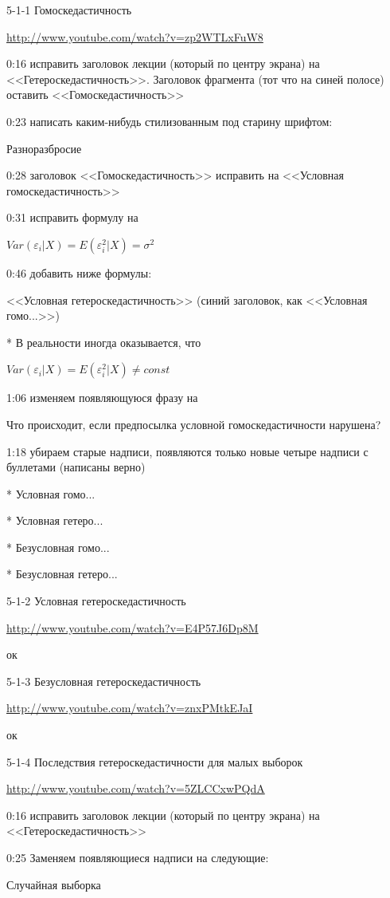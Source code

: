 \documentclass[12pt,a4paper]{article}
\newcommand{\e}{\varepsilon}
\begin{document}
5-1-1 Гомоскедастичность

\url{http://www.youtube.com/watch?v=zp2WTLxFuW8}

0:16 исправить заголовок лекции (который по центру экрана) на <<Гетероскедастичность>>. Заголовок фрагмента (тот что на синей полосе) оставить <<Гомоскедастичность>>


0:23 написать каким-нибудь стилизованным под старину шрифтом:

Разноразбросие

0:28 заголовок <<Гомоскедастичность>> исправить на <<Условная гомоскедастичность>>

0:31 исправить формулу на

$Var(\e_i|X)=E(\e_i^2|X)=\sigma^2$

0:46 добавить ниже формулы: 

<<Условная гетероскедастичность>>   (синий заголовок, как <<Условная гомо...>>)

* В реальности иногда оказывается, что

$Var(\e_i|X)=E(\e_i^2|X) \neq const$

1:06 изменяем появляющуюся фразу на 

Что происходит, если предпосылка условной гомоскедастичности нарушена?

1:18 убираем старые надписи, появляются только новые четыре надписи с буллетами (написаны верно)

* Условная гомо...

* Условная гетеро...

* Безусловная гомо...

* Безусловная гетеро...

5-1-2 Условная гетероскедастичность 

\url{http://www.youtube.com/watch?v=E4P57J6Dp8M}

ок

5-1-3 Безусловная гетероскедастичность

\url{http://www.youtube.com/watch?v=znxPMtkEJaI}

ок

5-1-4 Последствия гетероскедастичности для малых выборок

\url{http://www.youtube.com/watch?v=5ZLCCxwPQdA}

0:16 исправить заголовок лекции (который по центру экрана) на <<Гетероскедастичность>>


0:25 Заменяем появляющиеся надписи на следующие:

Случайная выборка
\end{document}
